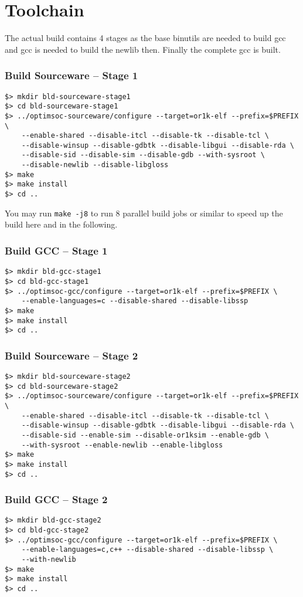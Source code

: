 \chapter{Toolchain}
\label{chap:toolchain}


The actual build contains 4 stages as the base binutils are needed to
build gcc and gcc is needed to build the newlib then. Finally the
complete gcc is built.

\subsection{Build Sourceware -- Stage 1}

\begin{verbatim}
$> mkdir bld-sourceware-stage1
$> cd bld-sourceware-stage1
$> ../optimsoc-sourceware/configure --target=or1k-elf --prefix=$PREFIX \
    --enable-shared --disable-itcl --disable-tk --disable-tcl \
    --disable-winsup --disable-gdbtk --disable-libgui --disable-rda \
    --disable-sid --disable-sim --disable-gdb --with-sysroot \
    --disable-newlib --disable-libgloss
$> make
$> make install
$> cd ..
\end{verbatim}

You may run \verb|make -j8| to run 8 parallel build jobs or similar to
speed up the build here and in the following.

\subsection{Build GCC -- Stage 1}

\begin{verbatim}
$> mkdir bld-gcc-stage1
$> cd bld-gcc-stage1
$> ../optimsoc-gcc/configure --target=or1k-elf --prefix=$PREFIX \
    --enable-languages=c --disable-shared --disable-libssp
$> make
$> make install
$> cd ..
\end{verbatim}

\subsection{Build Sourceware -- Stage 2}

\begin{verbatim}
$> mkdir bld-sourceware-stage2
$> cd bld-sourceware-stage2
$> ../optimsoc-sourceware/configure --target=or1k-elf --prefix=$PREFIX \
    --enable-shared --disable-itcl --disable-tk --disable-tcl \
    --disable-winsup --disable-gdbtk --disable-libgui --disable-rda \
    --disable-sid --enable-sim --disable-or1ksim --enable-gdb \
    --with-sysroot --enable-newlib --enable-libgloss
$> make
$> make install
$> cd ..
\end{verbatim}

\subsection{Build GCC -- Stage 2}

\begin{verbatim}
$> mkdir bld-gcc-stage2
$> cd bld-gcc-stage2
$> ../optimsoc-gcc/configure --target=or1k-elf --prefix=$PREFIX \
    --enable-languages=c,c++ --disable-shared --disable-libssp \
    --with-newlib
$> make
$> make install
$> cd ..
\end{verbatim}

